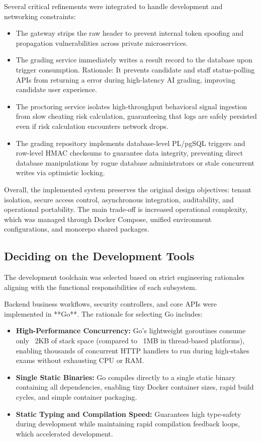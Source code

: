 Several critical refinements were integrated to handle development and networking constraints:
\begin{itemize}
    \item The gateway strips the raw  header to prevent internal token spoofing and propagation vulnerabilities across private microservices.
    \item The grading service immediately writes a  result record to the database upon trigger consumption. Rationale: It prevents candidate and staff status-polling APIs from returning a  error during high-latency AI grading, improving candidate user experience.
    \item The proctoring service isolates high-throughput behavioral signal ingestion from slow cheating risk calculation, guaranteeing that logs are safely persisted even if risk calculation encounters network drops.
    \item The grading repository implements database-level PL/pgSQL triggers and row-level HMAC checksums to guarantee data integrity, preventing direct database manipulations by rogue database administrators or stale concurrent writes via optimistic locking.
\end{itemize}

Overall, the implemented system preserves the original design objectives: tenant isolation, secure access control, asynchronous integration, auditability, and operational portability. The main trade-off is increased operational complexity, which was managed through Docker Compose, unified environment configurations, and monorepo shared packages.

\subsection{Deciding on the Development Tools}
The development toolchain was selected based on strict engineering rationales aligning with the functional responsibilities of each subsystem. 

Backend business workflows, security controllers, and core APIs were implemented in **Go**. The rationale for selecting Go includes:
\begin{itemize}
    \item \textbf{High-Performance Concurrency:} Go's lightweight goroutines consume only ~2KB of stack space (compared to ~1MB in thread-based platforms), enabling thousands of concurrent HTTP handlers to run during high-stakes exams without exhausting CPU or RAM.
    \item \textbf{Single Static Binaries:} Go compiles directly to a single static binary containing all dependencies, enabling tiny Docker container sizes, rapid build cycles, and simple container packaging.
    \item \textbf{Static Typing and Compilation Speed:} Guarantees high type-safety during development while maintaining rapid compilation feedback loops, which accelerated development.
\end{itemize}

